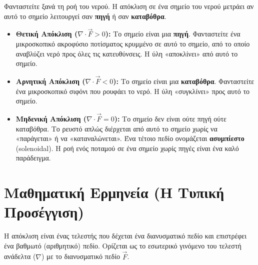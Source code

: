 \documentclass[a4paper,12pt,twoside]{article}
\newcommand{\en}[1]{{\selectlanguage{english}#1\selectlanguage{greek}}}
\begin{document}
Φανταστείτε ξανά τη ροή του νερού. Η απόκλιση σε ένα σημείο του νερού μετράει αν αυτό το σημείο λειτουργεί σαν \textbf{πηγή} ή σαν \textbf{καταβόθρα}.

\begin{itemize}
    \item \textbf{Θετική Απόκλιση ($\nabla \cdot \vec{F} > 0$):} Το σημείο είναι μια \textbf{πηγή}. Φανταστείτε ένα μικροσκοπικό ακροφύσιο ποτίσματος κρυμμένο σε αυτό το σημείο, από το οποίο αναβλύζει νερό προς όλες τις κατευθύνσεις. Η ύλη «αποκλίνει» από αυτό το σημείο.
    
    \item \textbf{Αρνητική Απόκλιση ($\nabla \cdot \vec{F} < 0$):} Το σημείο είναι μια \textbf{καταβόθρα}. Φανταστείτε ένα μικροσκοπικό σιφόνι που ρουφάει το νερό. Η ύλη «συγκλίνει» προς αυτό το σημείο.
    
    \item \textbf{Μηδενική Απόκλιση ($\nabla \cdot \vec{F} = 0$):} Το σημείο δεν είναι ούτε πηγή ούτε καταβόθρα. Το ρευστό απλώς διέρχεται από αυτό το σημείο χωρίς να «παράγεται» ή να «καταναλώνεται». Ένα τέτοιο πεδίο ονομάζεται \textbf{ασυμπίεστο} (\en{solenoidal}). Η ροή ενός ποταμού σε ένα σημείο χωρίς πηγές είναι ένα καλό παράδειγμα.
\end{itemize}



\begin{center}
\end{center}

\section{Μαθηματική Ερμηνεία (Η Τυπική Προσέγγιση)}
Η απόκλιση είναι ένας τελεστής που δέχεται ένα διανυσματικό πεδίο και επιστρέφει ένα βαθμωτό (αριθμητικό) πεδίο. Ορίζεται ως το εσωτερικό γινόμενο του τελεστή ανάδελτα ($\nabla$) με το διανυσματικό πεδίο $\vec{F}$.
\end{document}

